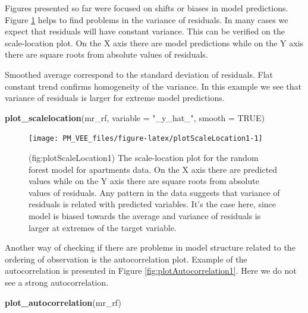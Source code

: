 \documentclass[12pt,]{krantz}
\newenvironment{Shaded}{\begin{snugshade}}{\end{snugshade}}
\newcommand{\DataTypeTok}[1]{\textcolor[rgb]{0.13,0.29,0.53}{#1}}
\newcommand{\KeywordTok}[1]{\textcolor[rgb]{0.13,0.29,0.53}{\textbf{#1}}}
\newcommand{\NormalTok}[1]{#1}
\newcommand{\OtherTok}[1]{\textcolor[rgb]{0.56,0.35,0.01}{#1}}
\newcommand{\StringTok}[1]{\textcolor[rgb]{0.31,0.60,0.02}{#1}}
\begin{document}
Figures presented so far were focused on shifts or biases in model predictions.
Figure \ref{fig:plotScaleLocation1} helps to find problems in the variance of residuals. In many cases we expect that residuals will have constant variance. This can be verified on the scale-location plot. On the X axis there are model predictions while on the Y axis there are square roots from absolute values of residuals.

Smoothed average correspond to the standard deviation of residuals. Flat constant trend confirms homogeneity of the variance. In this example we see that variance of residuals is larger for extreme model predictions.

\begin{Shaded}
\begin{Highlighting}[]
\KeywordTok{plot_scalelocation}\NormalTok{(mr_rf, }\DataTypeTok{variable =} \StringTok{"_y_hat_"}\NormalTok{, }\DataTypeTok{smooth =} \OtherTok{TRUE}\NormalTok{)}
\end{Highlighting}
\end{Shaded}

\begin{figure}

{\centering \texttt{[image: PM\_VEE\_files/figure-latex/plotScaleLocation1-1]} 

}

\caption{(fig:plotScaleLocation1) The scale-location plot for the random forest model for apartments data. On the X axis there are predicted values while on the Y axis there are square roots from absolute values of residuals. Any pattern in the data suggests that variance of residuals is related with predicted variables. It's the case here, since model is biased towards the average and variance of residuals is larger at extremes of the target variable.}\label{fig:plotScaleLocation1}
\end{figure}

Another way of checking if there are problems in model structure related to the ordering of observation is the autocorrelation plot. Example of the autocorrelation is presented in Figure \ref{fig:plotAutocorrelation1}. Here we do not see a strong autocorrelation.

\begin{Shaded}
\begin{Highlighting}[]
\KeywordTok{plot_autocorrelation}\NormalTok{(mr_rf)}
\end{Highlighting}
\end{Shaded}
\end{document}
